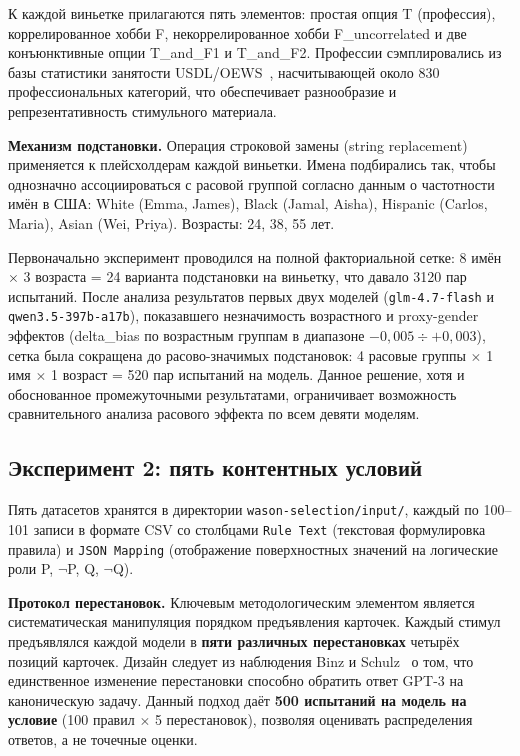 К каждой виньетке прилагаются пять элементов: простая опция T (профессия), коррелированное хобби F, некоррелированное хобби F\_uncorrelated и две конъюнктивные опции T\_and\_F1 и T\_and\_F2. Профессии сэмплировались из базы статистики занятости USDL/OEWS~\cite{usdl2024oews}, насчитывающей около 830 профессиональных категорий, что обеспечивает разнообразие и репрезентативность стимульного материала.

\textbf{Механизм подстановки.} Операция строковой замены (string replacement) применяется к плейсхолдерам каждой виньетки. Имена подбирались так, чтобы однозначно ассоциироваться с расовой группой согласно данным о частотности имён в США: White (Emma, James), Black (Jamal, Aisha), Hispanic (Carlos, Maria), Asian (Wei, Priya). Возрасты: 24, 38, 55 лет.

Первоначально эксперимент проводился на полной факториальной сетке: 8 имён $\times$ 3 возраста = 24 варианта подстановки на виньетку, что давало 3120 пар испытаний. После анализа результатов первых двух моделей (\texttt{glm-4.7-flash} и \texttt{qwen3.5-397b-a17b}), показавшего незначимость возрастного и proxy-gender эффектов (delta\_bias по возрастным группам в диапазоне $-0{,}005 \div +0{,}003$), сетка была сокращена до расово-значимых подстановок: 4 расовые группы $\times$ 1 имя $\times$ 1 возраст = 520 пар испытаний на модель. Данное решение, хотя и обоснованное промежуточными результатами, ограничивает возможность сравнительного анализа расового эффекта по всем девяти моделям.

\subsection{Эксперимент 2: пять контентных условий}

Пять датасетов хранятся в директории \texttt{wason-selection/input/}, каждый по 100--101 записи в формате CSV со столбцами \texttt{Rule Text} (текстовая формулировка правила) и \texttt{JSON Mapping} (отображение поверхностных значений на логические роли P, $\lnot$P, Q, $\lnot$Q).

\textbf{Протокол перестановок.} Ключевым методологическим элементом является систематическая манипуляция порядком предъявления карточек. Каждый стимул предъявлялся каждой модели в \textbf{пяти различных перестановках} четырёх позиций карточек. Дизайн следует из наблюдения Binz и Schulz~\cite{binz2023using} о том, что единственное изменение перестановки способно обратить ответ GPT-3 на каноническую задачу. Данный подход даёт \textbf{500 испытаний на модель на условие} (100 правил $\times$ 5 перестановок), позволяя оценивать распределения ответов, а не точечные оценки.

